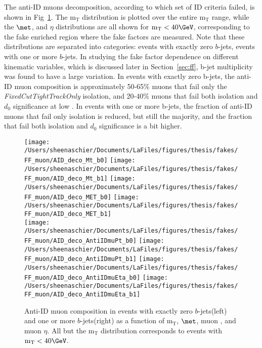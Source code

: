 The anti-ID muons decomposition, according to which set of ID criteria failed, is shown in Fig~\ref{fig:muDeco}. The $\mathrm{m_T}$ distribution is plotted over the entire $\mathrm{m_T}$ range, while the $\met$, \pt{} and $\eta$ distributions are all shown for $\mathrm{m_T} <40\GeV$, corresponding to the fake enriched region where the fake factors are measured.  Note that these distributions are separated into categories: events with exactly zero $b$-jets, events with one or more $b$-jets.  In studying the fake factor dependence on different kinematic variables, which is discussed later in Section~\ref{sec:ff}, b-jet multiplicity was found to have a large variation.  In events with exactly zero b-jets, the anti-ID muon composition is approximately 50-65$\%$ muons that fail only the \textit{FixedCutTightTrackOnly} isolation, and 20-40$\%$ muons that fail both isolation and $d_0$ significance at low \pt.  In events with one or more b-jets, the fraction of anti-ID muons that fail only isolation is reduced, but still the majority, and the fraction that fail both isolation and $d_0$ significance is a bit higher.     
\begin{figure}
        \centering
        \texttt{[image: /Users/sheenaschier/Documents/LaFiles/figures/thesis/fakes/FF\_muon/AID\_deco\_Mt\_b0]}
                \texttt{[image: /Users/sheenaschier/Documents/LaFiles/figures/thesis/fakes/FF\_muon/AID\_deco\_Mt\_b1]}
        \texttt{[image: /Users/sheenaschier/Documents/LaFiles/figures/thesis/fakes/FF\_muon/AID\_deco\_MET\_b0]}
        \texttt{[image: /Users/sheenaschier/Documents/LaFiles/figures/thesis/fakes/FF\_muon/AID\_deco\_MET\_b1]}\\
                \texttt{[image: /Users/sheenaschier/Documents/LaFiles/figures/thesis/fakes/FF\_muon/AID\_deco\_AntiIDmuPt\_b0]}
                        \texttt{[image: /Users/sheenaschier/Documents/LaFiles/figures/thesis/fakes/FF\_muon/AID\_deco\_AntiIDmuPt\_b1]}
        \texttt{[image: /Users/sheenaschier/Documents/LaFiles/figures/thesis/fakes/FF\_muon/AID\_deco\_AntiIDmuEta\_b0]}
        \texttt{[image: /Users/sheenaschier/Documents/LaFiles/figures/thesis/fakes/FF\_muon/AID\_deco\_AntiIDmuEta\_b1]}\\
        \caption{Anti-ID muon composition in events with exactly zero $b$-jets(left) and one or more $b$-jets(right) as a function of $\mathrm{m_T}$, $\met$, muon \pt{}, and muon $\eta$. All but the $\mathrm{m_T}$ distribution corresponds to events with $\mathrm{m_T} < 40\GeV$.}
        \label{fig:muDeco}
\end{figure}


